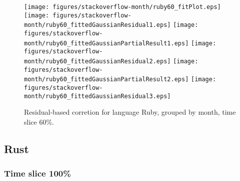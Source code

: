 \begin{figure}[t]
\centering
{}
{\texttt{[image: figures/stackoverflow-month/ruby60\_fitPlot.eps]}}
{\texttt{[image: figures/stackoverflow-month/ruby60\_fittedGaussianResidual1.eps]}}
{\texttt{[image: figures/stackoverflow-month/ruby60\_fittedGaussianPartialResult1.eps]}}
{\texttt{[image: figures/stackoverflow-month/ruby60\_fittedGaussianResidual2.eps]}}
{\texttt{[image: figures/stackoverflow-month/ruby60\_fittedGaussianPartialResult2.eps]}}
{\texttt{[image: figures/stackoverflow-month/ruby60\_fittedGaussianResidual3.eps]}}
\caption{Residual-based corretion for language Ruby, grouped by month, time slice 60\%.}
\end{figure}


\FloatBarrier


\subsection{Rust}

\subsubsection{Time slice 100\%}

